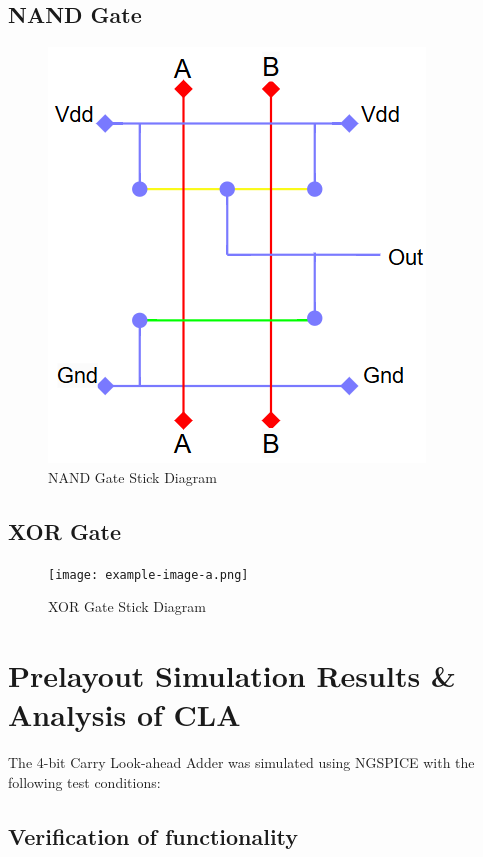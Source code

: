 \documentclass[conference]{IEEEtran}
\begin{document}
\subsection{NAND Gate}
\begin{figure}[H]
    \centering
    \includegraphics[width=0.5\linewidth]{sticknand.png}
    \caption{NAND Gate Stick Diagram}
    \label{fig:nand}
\end{figure}

\subsection{XOR Gate}
\begin{figure}[H]
    \centering
    \texttt{[image: example-image-a.png]}
    \caption{XOR Gate Stick Diagram}
    \label{fig:xor}
\end{figure}



\section{Prelayout Simulation Results \& Analysis of CLA}
The 4-bit Carry Look-ahead Adder was simulated using NGSPICE with the following test conditions:

\subsection{Verification of functionality}
\end{document}
